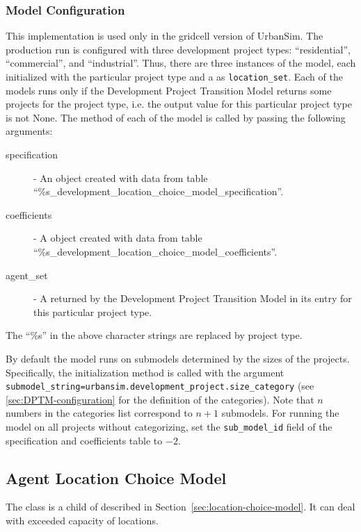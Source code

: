 \subsubsection{Model Configuration}
%
This implementation is used only in the gridcell version of UrbanSim.
The production run is configured with three development project
types: ``residential'', ``commercial'', and ``industrial''. Thus, there are
three instances of the model, each initialized with the particular project
type and a  as \verb|location_set|.  Each of the models 
runs only if the Development Project Transition Model returns some projects
for the project type, i.e. the output value for this particular project type
is not None.  The  method of each of the model is called by
passing the following arguments:
\begin{description}
\item[specification] - An
 object created with data from table
``\%s_development_location_choice_model_specification''. 
\item[coefficients] - A  object created
with data from table ``\%s_development_location_choice_model_coefficients''. 
\item[agent_set] - A  returned by the Development
  Project Transition Model in its entry for this particular project type.
\end{description}
The ``\%s'' in the above character strings are replaced by project type.

By default the model runs on submodels determined by the sizes of the projects. Specifically,
the initialization method is called with the argument \verb|submodel_string=urbansim.development_project.size_category|
(see \ref{sec:DPTM-configuration} for the definition of the categories). Note that $n$ numbers in
the categories list correspond to $n+1$ submodels. For running the model on all projects without categorizing, 
set the \verb|sub_model_id| field of the specification and coefficients table to $-2$.

%
%
\subsection{Agent Location Choice Model}
%
\label{sec:agent-lcm}

The class  is a child
of  described in
Section~\ref{sec:location-choice-model}. It can deal with exceeded capacity of locations.

